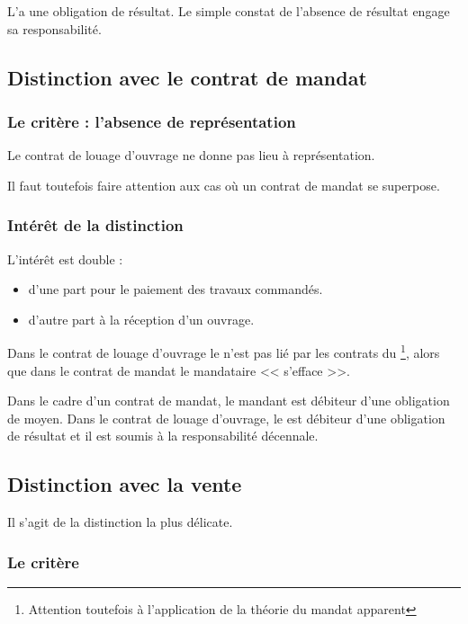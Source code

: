 				L'\E a une obligation de résultat. Le simple constat de l'absence de résultat engage sa responsabilité.

		\subsection{Distinction avec le contrat de mandat}

			\subsubsection{Le critère : l'absence de représentation}

				Le contrat de louage d'ouvrage ne donne pas lieu à représentation.

				\begin{conseil}
					Il faut toutefois faire attention aux cas où un contrat de mandat se superpose.
				\end{conseil}

			\subsubsection{Intérêt de la distinction}

			L'intérêt est double :
			\begin{itemize}
				\item d'une part pour le paiement des travaux commandés.
				\item d'autre part à la réception d'un ouvrage.
			\end{itemize}

			Dans le contrat de louage d'ouvrage le \Mo{} n'est pas lié par les contrats du \lo{}\footnote{Attention toutefois à l'application de la théorie du mandat apparent}, alors que dans le contrat de mandat le mandataire << s'efface >>.

			Dans le cadre d'un contrat de mandat, le mandant est débiteur d'une obligation de moyen. Dans le contrat de louage d'ouvrage, le \lo{} est débiteur d'une obligation de résultat et il est soumis à la responsabilité décennale.

		\subsection{Distinction avec la vente}

			Il s'agit de la distinction la plus délicate.

			\subsubsection{Le critère}

